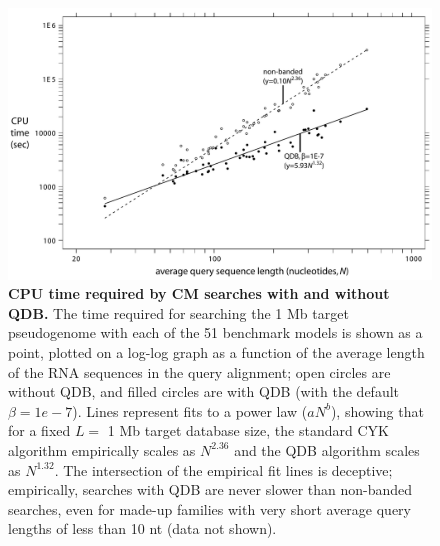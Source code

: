 \begin{figure}
\begin{center}
\includegraphics[width=6.4in]{figs/speedup}
\caption{\textbf{CPU time required by CM searches with and without
    QDB.} The time required for searching the 1 Mb target pseudogenome
    with each of the 51 benchmark models is shown as a point, plotted
    on a log-log graph as a function of the average length of the RNA
    sequences in the query alignment; open circles are without QDB,
    and filled circles are with QDB (with the default $\beta =
    1e-7$). Lines represent fits to a power law ($aN^b$), showing that
    for a fixed $L=$ 1 Mb target database size, the standard CYK
    algorithm empirically scales as $N^{2.36}$ and the QDB algorithm
    scales as $N^{1.32}$. The intersection of the empirical fit lines
    is deceptive; empirically, searches with QDB are never slower than
    non-banded searches, even for made-up families with very short
    average query lengths of less than 10 nt (data not shown).}
\label{fig:speedup}
\end{center}
\end{figure}
